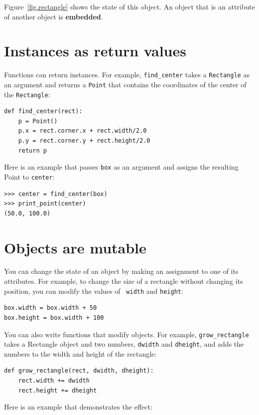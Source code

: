 \documentclass[12pt,a4paper,final,twoside,onecolumn,titlepage]{book}
\begin{document}
Figure~\ref{fig.rectangle} shows the state of this object.
An object that is an attribute of another object is {\bf embedded}.


\section{Instances as return values}

Functions can return instances.  For example, \verb"find_center"
takes a {\tt Rectangle} as an argument and returns a {\tt Point}
that contains the coordinates of the center of the {\tt Rectangle}:

\begin{verbatim}
def find_center(rect):
    p = Point()
    p.x = rect.corner.x + rect.width/2.0
    p.y = rect.corner.y + rect.height/2.0
    return p
\end{verbatim}
%
Here is an example that passes {\tt box} as an argument and assigns
the resulting Point to {\tt center}:

\begin{verbatim}
>>> center = find_center(box)
>>> print_point(center)
(50.0, 100.0)
\end{verbatim}
%

\section{Objects are mutable}

You can change the state of an object by making an assignment to one of
its attributes.  For example, to change the size of a rectangle
without changing its position, you can modify the values of {\tt
width} and {\tt height}:

\begin{verbatim}
box.width = box.width + 50
box.height = box.width + 100
\end{verbatim}
%
You can also write functions that modify objects.  For example,
\verb"grow_rectangle" takes a Rectangle object and two numbers,
{\tt dwidth} and {\tt dheight}, and adds the numbers to the
width and height of the rectangle:

\begin{verbatim}
def grow_rectangle(rect, dwidth, dheight):
    rect.width += dwidth
    rect.height += dheight
\end{verbatim}
%
Here is an example that demonstrates the effect:
\end{document}
